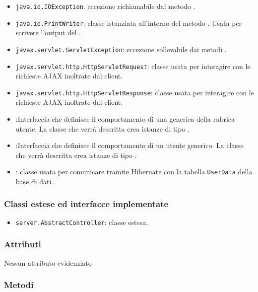 \begin{itemize}
	\item \texttt{java.io.IOException}: eccezione richiamabile dal metodo .
	\item \texttt{java.io.PrintWriter}: classe istanziata all'interno del metodo . Usata per scrivere l'output del .
	\item \texttt{javax.servlet.ServletException}: eccezione sollevabile dai metodi .
	\item \texttt{javax.servlet.http.HttpServletRequest}: classe usata per interagire con le richieste AJAX inoltrate dal client.
	\item \texttt{javax.servlet.http.HttpServletResponse}: classe usata per interagire con le richieste AJAX inoltrate dal client.
	\item {}:Interfaccia che definisce il comportamento di una generica  della rubrica utente. La classe che verrà descritta crea istanze di tipo .
	\item {}:Interfaccia che definisce il comportamento di un utente generico. La classe che verrà descritta crea istanze di tipo .
	\item {}: classe usata per comunicare tramite Hibernate con la tabella \texttt{UserData} della base di dati.
\end{itemize}

\subsubsection*{Classi estese ed interfacce implementate}
\begin{itemize}
	\item \texttt{server.AbstractController}: classe estesa.
\end{itemize}

\subsubsection*{Attributi}

Nessun attributo evidenziato


\subsubsection*{Metodi}

